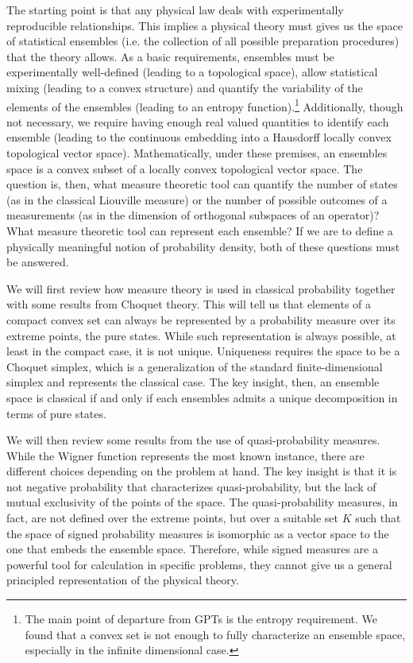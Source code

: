 \documentclass[10pt,twocolumn, nofootinbib]{revtex4-2}
\begin{document}
The starting point is that any physical law deals with experimentally reproducible relationships. This implies a physical theory must gives us the space of statistical ensembles (i.e. the collection of all possible preparation procedures) that the theory allows. As a basic requirements, ensembles must be experimentally well-defined (leading to a topological space), allow statistical mixing (leading to a convex structure) and quantify the variability of the elements of the ensembles (leading to an entropy function).\footnote{The main point of departure from GPTs is the entropy requirement. We found that a convex set is not enough to fully characterize an ensemble space, especially in the infinite dimensional case.} Additionally, though not necessary, we require having enough real valued quantities to identify each ensemble (leading to the continuous embedding into a Hausdorff locally convex topological vector space). Mathematically, under these premises, an ensembles space is a convex subset of a locally convex topological vector space. The question is, then, what measure theoretic tool can quantify the number of states (as in the classical Liouville measure) or the number of possible outcomes of a measurements (as in the dimension of orthogonal subspaces of an operator)? What measure theoretic tool can represent each ensemble? If we are to define a physically meaningful notion of probability density, both of these questions must be answered.

We will first review how measure theory is used in classical probability together with some results from Choquet theory. This will tell us that elements of a compact convex set can always be represented by a probability measure over its extreme points, the pure states. While such representation is always possible, at least in the compact case, it is not unique. Uniqueness requires the space to be a Choquet simplex, which is a generalization of the standard finite-dimensional simplex and represents the classical case. The key insight, then, an ensemble space is classical if and only if each ensembles admits a unique decomposition in terms of pure states.

We will then review some results from the use of quasi-probability measures. While the Wigner function represents the most known instance, there are different choices depending on the problem at hand. The key insight is that it is not negative probability that characterizes quasi-probability, but the lack of mutual exclusivity of the points of the space. The quasi-probability measures, in fact, are not defined over the extreme points, but over a suitable set $K$ such that the space of signed probability measures is isomorphic as a vector space to the one that embeds the ensemble space. Therefore, while signed measures are a powerful tool for calculation in specific problems, they cannot give us a general principled representation of the physical theory.
\end{document}
